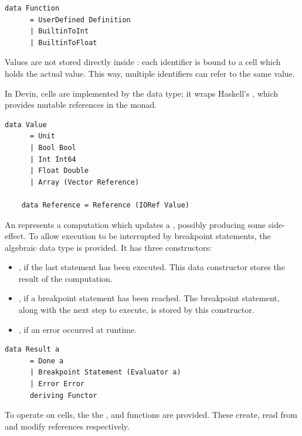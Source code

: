 \documentclass[UdineBachThesis,american,11pt]{PhdThesis}
\begin{document}
  \begin{lstlisting}[gobble=4,basicstyle=\ttfamily\small]
    data Function
      = UserDefined Definition
      | BuiltinToInt
      | BuiltinToFloat
  \end{lstlisting}

  Values are not stored directly inside \lstinline@State@: each identifier is
  bound to a cell which holds the actual value. This way, multiple identifiers
  can refer to the same value.

  In Devin, cells are implemented by the \lstinline@Reference@ data type; it
  wraps Haskell's \lstinline@IORef@, which provides mutable references in the
  \lstinline@IO@ monad.

  \begin{lstlisting}[gobble=4,basicstyle=\ttfamily\small]
    data Value
      = Unit
      | Bool Bool
      | Int Int64
      | Float Double
      | Array (Vector Reference)

    data Reference = Reference (IORef Value)
  \end{lstlisting}

  An \lstinline@Evaluator@ represents a computation which updates a
  \lstinline@State@, possibly producing some side-effect. To allow execution to
  be interrupted by breakpoint statements, the algebraic data type
  \lstinline@Result@ is provided. It has three constructors:

  \begin{itemize}
    \item \lstinline@Done@, if the last statement has been executed. This data
    constructor stores the result of the computation.

    \item \lstinline@Breakpoint@, if a breakpoint statement has been reached.
    The breakpoint statement, along with the next step to execute, is stored by
    this constructor.

    \item \lstinline@Error@, if an error occurred at runtime.
  \end{itemize}

  \begin{lstlisting}[gobble=4,basicstyle=\ttfamily\small]
    data Result a
      = Done a
      | Breakpoint Statement (Evaluator a)
      | Error Error
      deriving Functor
  \end{lstlisting}

  To operate on cells, the the \lstinline@newRef@, \lstinline@readRef@ and
  \lstinline@writeRef@ functions are provided. These create, read from and
  modify references respectively.
\end{document}
